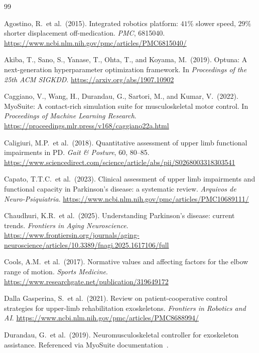\documentclass{article}
\begin{document}
\begin{thebibliography}{99}

Agostino, R.\ et al.\ (2015).
Integrated robotics platform: $41\%$ slower speed, $29\%$ shorter
displacement off-medication.
\textit{PMC}, 6815040.
\url{https://www.ncbi.nlm.nih.gov/pmc/articles/PMC6815040/}

Akiba, T., Sano, S., Yanase, T., Ohta, T., and Koyama, M.\ (2019).
Optuna: A next-generation hyperparameter optimization framework.
In \textit{Proceedings of the 25th ACM SIGKDD}.
\url{https://arxiv.org/abs/1907.10902}

Caggiano, V., Wang, H., Durandau, G., Sartori, M., and Kumar, V.\ (2022).
MyoSuite: A contact-rich simulation suite for musculoskeletal motor control.
In \textit{Proceedings of Machine Learning Research}.
\url{https://proceedings.mlr.press/v168/caggiano22a.html}

Caligiuri, M.P.\ et al.\ (2018).
Quantitative assessment of upper limb functional impairments in PD.
\textit{Gait \& Posture}, 60, 80--85.
\url{https://www.sciencedirect.com/science/article/abs/pii/S0268003318303541}

Capato, T.T.C.\ et al.\ (2023).
Clinical assessment of upper limb impairments and functional capacity in
Parkinson's disease: a systematic review.
\textit{Arquivos de Neuro-Psiquiatria}.
\url{https://www.ncbi.nlm.nih.gov/pmc/articles/PMC10689111/}

Chaudhuri, K.R.\ et al.\ (2025).
Understanding Parkinson's disease: current trends.
\textit{Frontiers in Aging Neuroscience}.
\url{https://www.frontiersin.org/journals/aging-neuroscience/articles/10.3389/fnagi.2025.1617106/full}

Cools, A.M.\ et al.\ (2017).
Normative values and affecting factors for the elbow range of motion.
\textit{Sports Medicine}.
\url{https://www.researchgate.net/publication/319649172}

Dalla Gasperina, S.\ et al.\ (2021).
Review on patient-cooperative control strategies for upper-limb
rehabilitation exoskeletons.
\textit{Frontiers in Robotics and AI}.
\url{https://www.ncbi.nlm.nih.gov/pmc/articles/PMC8688994/}

Durandau, G.\ et al.\ (2019).
Neuromusculoskeletal controller for exoskeleton assistance.
Referenced via MyoSuite documentation~\citep{caggiano2022}.


\end{thebibliography}
\end{document}
